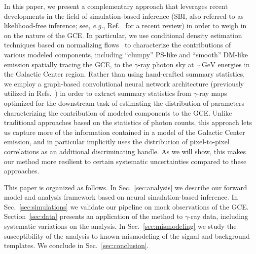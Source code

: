 \documentclass[prd,aps,10pt,nofootinbib,twocolumn,superscriptaddress,preprintnumbers,balancelastpage,longbibliography]{revtex4-1}
\begin{document}
In this paper, we present a complementary approach that leverages recent developments in the field of simulation-based inference (SBI, also referred to as likelihood-free inference; see, \emph{e.g.}, Ref.~\cite{cranmer2020frontier} for a recent review)
in order to weigh in on the nature of the GCE. In particular, we use conditional density estimation techniques based on normalizing flows~\cite{papamakarios2019normalizing,rezende2015variational} to characterize the contributions of various modeled components, including ``clumpy'' PS-like and ``smooth'' DM-like emission spatially tracing the GCE, to the $\gamma$-ray photon sky at $\sim\mathrm{GeV}$ energies in the Galactic Center region. Rather than using hand-crafted summary statistics, we employ a graph-based convolutional neural network architecture (previously utilized in Refs.~\cite{List:2020mzd,List:2021aer}) in order to extract summary statistics from $\gamma$-ray maps optimized for the downstream task of estimating the distribution of parameters characterizing the contribution of modeled components to the GCE. Unlike traditional approaches based on the statistics of photon counts, this approach lets us capture more of the information contained in a model of the Galactic Center emission, and in particular implicitly uses the distribution of pixel-to-pixel correlations as an additional discriminating handle. As we will show, this makes our method more resilient to certain systematic uncertainties compared to these approaches.

This paper is organized as follows. In Sec.~\ref{sec:analysis} we describe our forward model and analysis framework based on neural simulation-based inference. In Sec.~\ref{sec:simulations} we validate our pipeline on mock observations of the \Fermi GCE. Section~\ref{sec:data} presents an application of the method to \Fermi $\gamma$-ray data, including systematic variations on the analysis. In Sec.~\ref{sec:mismodeling} we study the susceptibility of the analysis to known mismodeling of the signal and background templates. We conclude in Sec.~\ref{sec:conclusion}.
\end{document}
